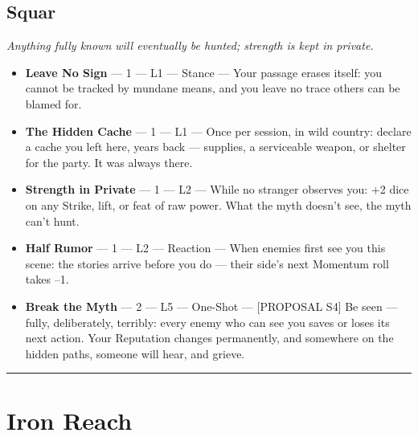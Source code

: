 \subsection{Squar}
\textit{Anything fully known will eventually be hunted; strength is kept in private.}
\begin{itemize}
    \item \textbf{Leave No Sign} --- 1 --- L1 --- Stance --- Your passage erases itself: you cannot be tracked by mundane means, and you leave no trace others can be blamed for.
    \item \textbf{The Hidden Cache} --- 1 --- L1 --- Once per session, in wild country: declare a cache you left here, years back --- supplies, a serviceable weapon, or shelter for the party. It was always there.
    \item \textbf{Strength in Private} --- 1 --- L2 --- While no stranger observes you: +2 dice on any Strike, lift, or feat of raw power. What the myth doesn't see, the myth can't hunt.
    \item \textbf{Half Rumor} --- 1 --- L2 --- Reaction --- When enemies first see you this scene: the stories arrive before you do --- their side's next Momentum roll takes --1.
    \item \textbf{Break the Myth} --- 2 --- L5 --- One-Shot --- [PROPOSAL S4] Be seen --- fully, deliberately, terribly: every enemy who can see you saves or loses its next action. Your Reputation changes permanently, and somewhere on the hidden paths, someone will hear, and grieve.
\end{itemize}

\medskip\hrule\medskip

\section{Iron Reach}

